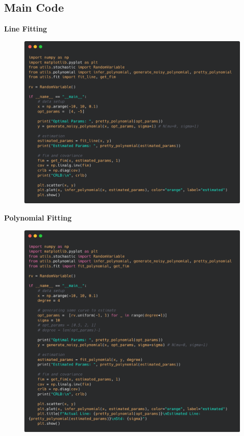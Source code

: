 \documentclass[12pt]{article}
\begin{document}
\subsection{Main Code}
\textbf{Line Fitting}
\begin{figure}[H] 
\centering \includegraphics[scale=0.2]{code-lf.png}  
\end{figure}
\textbf{Polynomial Fitting}
\begin{figure}[H] 
\centering \includegraphics[scale=0.2]{code-pf.png}  
\end{figure}
\end{document}
